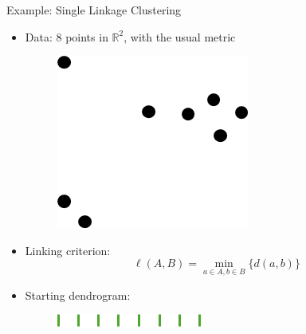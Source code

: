 \documentclass{beamer}
\begin{document}
\begin{frame}{Example: Single Linkage Clustering}
  \begin{itemize}
    \item Data: 8 points in $\mathbb{R}^2$, with the usual metric
    \vspace*{.5cm}
    \begin{figure}
      \begin{center}
        \includegraphics[width=.35\textwidth]{cluster0.png}
      \end{center}
    \end{figure}
    \vspace*{.5cm}
    \item Linking criterion: $$\ell(A, B) = \min_{a\in A, b\in B}\{d(a,b)\}$$
    \item Starting dendrogram:
    \begin{figure}
      \begin{center}
        \includegraphics[width=.4\textwidth]{eightdend.png}
      \end{center}
    \end{figure}
  \end{itemize}
\end{frame}
\end{document}
